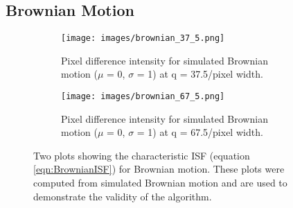 \documentclass[11pt]{article}
\begin{document}
\subsection{Brownian Motion}
\label{section:brownian}
\begin{figure}[H]
\centering
\begin{subfigure}[t]{.47\textwidth}
  \centering
  \texttt{[image: images/brownian\_37\_5.png]}
  \caption{Pixel difference intensity for simulated Brownian motion ($\mu$ = 0, $\sigma$ = 1) at q = 37.5/pixel width.}
  \label{fig:simulated_brownian1_37_5}
\end{subfigure}%
\hfill
\begin{subfigure}[t]{.47\textwidth}
  \centering
  \texttt{[image: images/brownian\_67\_5.png]}
  \caption{Pixel difference intensity for simulated Brownian motion ($\mu$ = 0, $\sigma$ = 1) at q = 67.5/pixel width.}
 \label{fig:simulated_brownian1_67_5}
\end{subfigure}
\caption{Two plots showing the characteristic ISF (equation \ref{eqn:BrownianISF}) for Brownian motion. These plots were computed from simulated Brownian motion and are used to demonstrate the validity of the algorithm.}
\label{fig:simulated_brownian1}
\end{figure}
\end{document}
